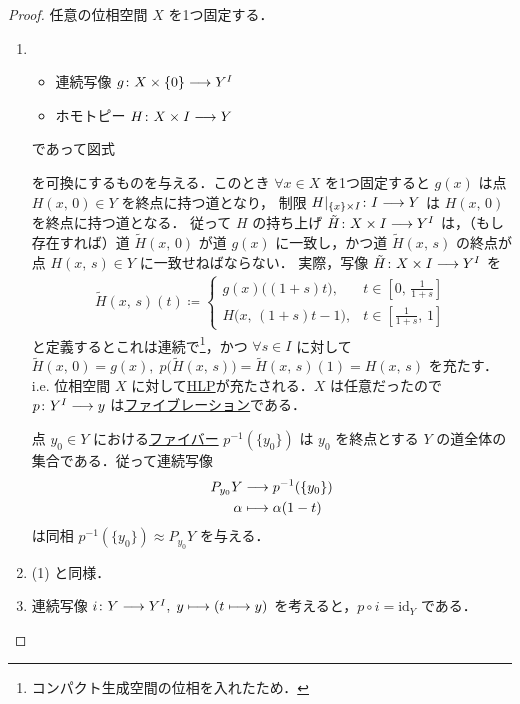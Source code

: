 \documentclass[algtopo_main]{subfiles}
\begin{document}
\begin{proof}
    任意の位相空間 $X$ を1つ固定する．
    \begin{enumerate}
        \item \begin{itemize}
            \item 連続写像 $g \colon X \times \{0\} \longrightarrow Y^I$
            \item ホモトピー $H \colon X \times I \longrightarrow Y$
        \end{itemize}
        であって図式
        \begin{center}
        \end{center}
        を可換にするものを与える．このとき $\forall x \in X$ を1つ固定すると $g(x)$ は点 $H(x,\, 0) \in Y$ を終点に持つ道となり，
        制限 $H|_{\{x\} \times I} \colon I \longrightarrow Y$ は $H(x,\, 0)$ を終点に持つ道となる．
        従って $H$ の持ち上げ $\tilde{H} \colon X \times I \longrightarrow Y^I$ は，（もし存在すれば）道 $\tilde{H}(x,\, 0)$ が道 $g(x)$ に一致し，かつ道 $\tilde{H}(x,\, s)$ の終点が点 $H(x,\, s) \in Y$ に一致せねばならない．
        実際，写像 $\tilde{H} \colon X \times I \longrightarrow Y^I$ を
        \begin{align}
            \tilde{H}(x,\, s)(t) \coloneqq
            \begin{cases}
                g(x) \bigl( (1+s)t \bigr), & t \in [0,\, \frac{1}{1+s}] \\
                H\bigl(x,\, (1+s)t - 1\bigr), & t \in [\frac{1}{1+s},\, 1]
            \end{cases}
        \end{align}
        と定義するとこれは連続で\footnote{コンパクト生成空間の位相を入れたため．}，かつ $\forall s \in I$ に対して $\tilde{H}(x,\, 0) = g(x),\; p \bigl( \tilde{H}(x,\, s) \bigr) = \tilde{H}(x,\, s)(1) = H(x,\, s)$ を充たす．
        i.e. 位相空間 $X$ に対して\hyperref[def:HLP]{HLP}が充たされる．$X$ は任意だったので $p \colon Y^I \longrightarrow y$ は\hyperref[def:fibration]{ファイブレーション}である．
    
        点 $y_0 \in Y$ における\hyperref[thm:fiber-basic]{ファイバー} $p^{-1}(\{y_0\})$ は $y_0$ を終点とする $Y$ の道全体の集合である．従って連続写像
        \begin{align}
            P_{y_0}Y &\longrightarrow p^{-1}(\{y_0\}) \\
            \alpha &\longmapsto \alpha(1-t)
        \end{align}
        は同相 $p^{-1}(\{y_0\}) \approx P_{y_0}Y$ を与える．
        \item (1) と同様．
        \item 連続写像 $i \colon Y \longrightarrow Y^I,\; y \longmapsto (t \longmapsto y)$ を考えると，$p \circ i = \mathrm{id}_Y$ である．
        

\end{enumerate}
\end{proof}
\end{document}
